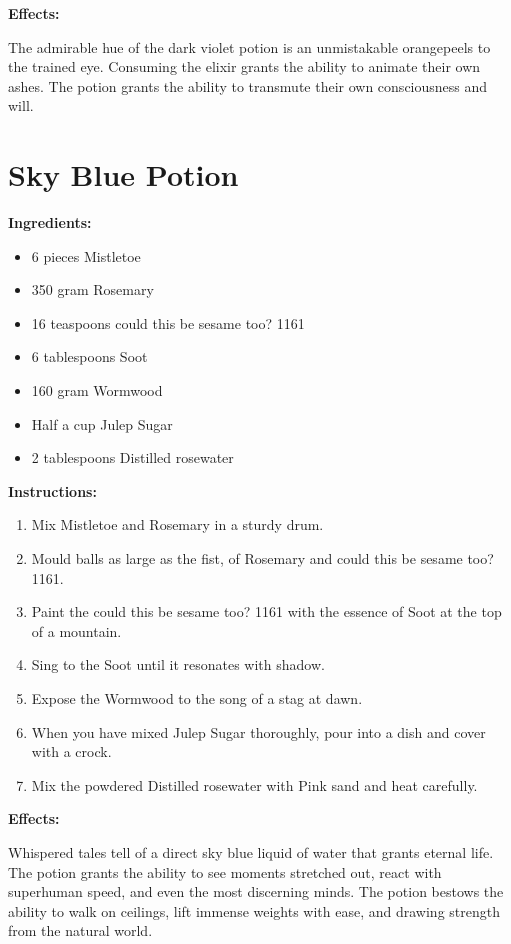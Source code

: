 \documentclass{article}
\begin{document}
\textbf{Effects:}

The admirable hue of the dark violet potion is an unmistakable orangepeels to the trained eye. Consuming the elixir grants the ability to animate their own ashes. The potion grants the ability to transmute their own consciousness and will.

\newpage
\section*{Sky Blue Potion}

\textbf{Ingredients:}

\begin{itemize}
  \item 6 pieces Mistletoe
  \item 350 gram Rosemary
  \item 16 teaspoons could this be sesame too? 1161
  \item 6 tablespoons Soot
  \item 160 gram Wormwood
  \item Half a cup Julep Sugar
  \item 2 tablespoons Distilled rosewater
\end{itemize}

\textbf{Instructions:}

\begin{enumerate}
  \item Mix Mistletoe and Rosemary in a sturdy drum.
  \item Mould balls as large as the fist, of Rosemary and could this be sesame too? 1161.
  \item Paint the could this be sesame too? 1161 with the essence of Soot at the top of a mountain.
  \item Sing to the Soot until it resonates with shadow.
  \item Expose the Wormwood to the song of a stag at dawn.
  \item When you have mixed Julep Sugar thoroughly, pour into a dish and cover with a crock.
  \item Mix the powdered Distilled rosewater with Pink sand and heat carefully.
\end{enumerate}

\textbf{Effects:}

Whispered tales tell of a direct sky blue liquid of water that grants eternal life. The potion grants the ability to see moments stretched out, react with superhuman speed, and even the most discerning minds. The potion bestows the ability to walk on ceilings, lift immense weights with ease, and drawing strength from the natural world.
\end{document}

